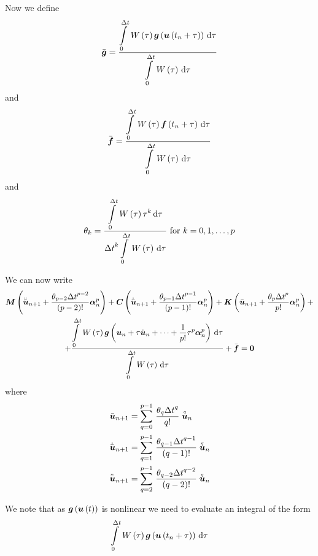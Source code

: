 Now we define 
\begin{equation}
  \bar{\vectr{g}}=\dfrac{\gint{0}{\Delta
      t}{\fnof{W}{\tau}\fnof{\vectr{g}}{\fnof{\vectr{u}}{t_{n}+\tau}}}{\tau}}{
    \gint{0}{\Delta t}{\fnof{W}{\tau}}{\tau}}
  \label{eqn:meanweightednonlinearvector}
\end{equation}
and
\begin{equation}
  \bar{\vectr{f}}=\dfrac{\gint{0}{\Delta
      t}{\fnof{W}{\tau}\fnof{\vectr{f}}{t_{n}+\tau}}{\tau}}{
    \gint{0}{\Delta t}{\fnof{W}{\tau}}{\tau}}
  \label{eqn:meanweightedloadvector}
\end{equation}
and
\begin{equation}
  \theta_{k}=\dfrac{\gint{0}{\Delta t}{\fnof{W}{\tau}\tau^{k}}{\tau}}{{\Delta
      t}^{k}\gint{0}{\Delta t}{\fnof{W}{\tau}}{\tau}} \text{  for  } k=0,1,\ldots,p
  \label{eqn:thetakdefinition}
\end{equation}

We can now write
\begin{multline}
  \matr{M}\pbrac{\ddot{\bar{\vectr{u}}}_{n+1}+\dfrac{\theta_{p-2}{\Delta
        t}^{p-2}}{\factorial{p-2}}\vectr{\alpha}^{p}_{n}}+
  \matr{C}\pbrac{\dot{\bar{\vectr{u}}}_{n+1}+\dfrac{\theta_{p-1}{\Delta
        t}^{p-1}}{\factorial{p-1}}\vectr{\alpha}^{p}_{n}}+
  \matr{K}\pbrac{\bar{\vectr{u}}_{n+1}+\dfrac{\theta_{p}{\Delta
        t}^{p}}{p!}\vectr{\alpha}^{p}_{n}}+ \\
  + \dfrac{\gint{0}{\Delta t}{\fnof{W}{\tau}\fnof{\vectr{g}}{\vectr{u}_{n}+\tau\dot{\vectr{u}}_{n}+\cdots+
        \dfrac{1}{p!}\tau^{p}\vectr{\alpha}^{p}_{n}}}{\tau}}{\gint{0}{\Delta
      t}{\fnof{W}{\tau}}{\tau}}+\bar{\vectr{f}}=\vectr{0}
  \label{eqn:dynamic1}
\end{multline}
where
\begin{equation}
  \begin{split}
    \bar{ \boldsymbol{u} }_{n+1} &=   \displaystyle\sum_{q=0}^{p-1} \,\dfrac{\theta_{q}{\Delta
            t}^{q}}{q!} \stackrel{\scriptscriptstyle q}{ \boldsymbol{u} } _{n}  \\
    \dot{\bar{ \boldsymbol{u} }}_{n+1} &=   \displaystyle\sum_{q=1}^{p-1} \,\dfrac{\theta_{q-1}{\Delta
            t}^{q-1}}{\left( q-1 \right)!} \stackrel{\scriptscriptstyle q}{ \boldsymbol{u} } _{n}  \\
    \ddot{\bar{ \boldsymbol{u} }}_{n+1} &=   \displaystyle\sum_{q=2}^{p-1} \,\dfrac{\theta_{q-2}{\Delta
            t}^{q-2}}{\left( q-2 \right)!} \stackrel{\scriptscriptstyle q}{ \boldsymbol{u} } _{n}  
  \end{split}
\end{equation}

We note that as $  \boldsymbol{g} \left(   \boldsymbol{u} \left( t \right)  \right) $ is nonlinear we need to
evaluate an integral of the form
\begin{equation}
  \gint{0}{\Delta
    t}{\fnof{W}{\tau}\fnof{\vectr{g}}{\fnof{\vectr{u}}{t_{n}+\tau}}}{\tau}
  \label{eqn:nonlineartimeweightintegral}
\end{equation}

